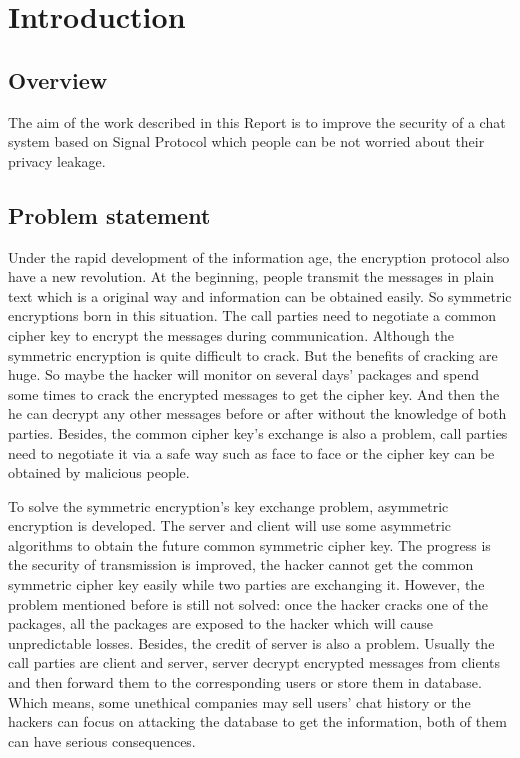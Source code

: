 \section{Introduction}
\subsection{Overview}
The aim of the work described in this Report is to improve the security of a chat system based on Signal Protocol which people can be not worried about their privacy leakage.
\subsection{Problem statement}
Under the rapid development of the information age, the encryption protocol also have a new revolution. At the beginning, people transmit the messages in plain text which is a original way and information can be obtained easily. So symmetric encryptions born in this situation. The call parties need to negotiate a common cipher key to encrypt the messages during communication. Although the symmetric encryption is quite difficult to crack. But the benefits of cracking are huge. So maybe the hacker will monitor on several days' packages and spend some times to crack the encrypted messages to get the cipher key. And then the he can decrypt any other messages before or after without the knowledge of both parties. Besides, the common cipher key's exchange is also a problem, call parties need to negotiate it via a safe way such as face to face or the cipher key can be obtained by malicious people.

To solve the symmetric encryption's key exchange problem, asymmetric encryption is developed. The server and client will use some asymmetric algorithms to obtain the future common symmetric cipher key. The progress is the security of transmission is improved, the hacker cannot get the common symmetric cipher key easily while two parties are exchanging it. However, the problem mentioned before is still not solved: once the hacker cracks one of the packages, all the packages are exposed to the hacker which will cause unpredictable losses. Besides, the credit of server is also a problem. Usually the call parties are client and server, server decrypt encrypted messages from clients and then forward them to the corresponding users or store them in database. Which means, some unethical companies may sell users' chat history or the hackers can focus on attacking the database to get the information, both of them can have serious consequences.

